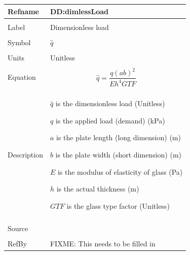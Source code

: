 \documentclass[12pt]{article}
\begin{document}
\noindent \begin{minipage}{\textwidth}
\begin{tabular}{p{} p{}}
\toprule \textbf{Refname} & \textbf{DD:dimlessLoad}
\label{DD:dimlessLoad}
\\ \midrule \\
Label & Dimensionless load
\\ \midrule \\
Symbol & $\hat{q}$
\\ \midrule \\
Units & Unitless
\\ \midrule \\
Equation & \begin{dmath}
           \hat{q}=\frac{q \left(a b\right)^{2}}{E h^{4} GTF}
           \end{dmath}
\\ \midrule \\
Description & \begin{description}
              \item{$\hat{q}$ is the dimensionless load (Unitless)}
              \item{$q$ is the applied load (demand) (kPa)}
              \item{$a$ is the plate length (long dimension) (m)}
              \item{$b$ is the plate width (short dimension) (m)}
              \item{$E$ is the modulus of elasticity of glass (Pa)}
              \item{$h$ is the actual thickness (m)}
              \item{$GTF$ is the glass type factor (Unitless)}
              \end{description}
\\ \midrule \\
Source & 
\\ \midrule \\
RefBy & FIXME: This needs to be filled in
\\ \bottomrule \end{tabular}
\end{minipage}\\
~\newline
\end{document}
